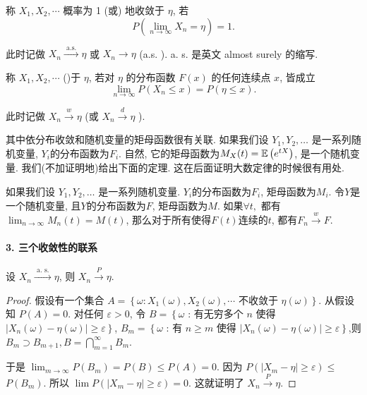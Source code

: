 \begin{definition}
    称 $X_1, X_2, \cdots$ 概率为 1 (或) 地收敛于 $\eta$, 若
$$
P\left(\lim _{n \rightarrow \infty} X_n=\eta\right)=1 .
$$

此时记做 $X_n \stackrel{\text { a.s. }}{\longrightarrow} \eta$ 或 $X_n \rightarrow \eta$ (a.s. ). a. s. 是英文 almost surely 的缩写.
\end{definition}

\begin{definition}
    称 $X_1, X_2, \cdots$ ()于 $\eta$, 若对 $\eta$ 的分布函数 $F(x)$ 的任何连续点 $x$, 皆成立
    $$
    \lim _{n \rightarrow \infty} P\left(X_n \leq x\right)=P(\eta \leq x) .
    $$
    
    此时记做 $X_n \stackrel{w}{\longrightarrow} \eta$ (或 $X_n \stackrel{d}{\longrightarrow} \eta$ ).
\end{definition}

其中依分布收敛和随机变量的矩母函数很有关联. 如果我们设 $Y_1, Y_2, \dots$ 是一系列随机变量, $Y_i$的分布函数为$F_i$. 自然, 它的矩母函数为$M_X(t)=\mathbb E\left( e^{t X}\right)$, 是一个随机变量. 我们(不加证明地)给出下面的定理. 这在后面证明大数定律的时候很有用处. 

\begin{theorem}
    \label{thm:dist-moment}
    如果我们设 $Y_1, Y_2, \dots$ 是一系列随机变量. $Y_i$的分布函数为$F_i$, 矩母函数为$M_i$. 令$Y$是一个随机变量, 且$Y$的分布函数为$F$, 矩母函数为$M$. 如果$\forall t,$ 都有$\lim _{n \rightarrow \infty} M_n(t)=M(t)$, 那么对于所有使得$F(t)$连续的$t$, 都有$F_n \stackrel{w}{\longrightarrow} F$. 
\end{theorem}

\paragraph{3. 三个收敛性的联系}

\begin{theorem}
    设 $X_n \stackrel{\text { a. s. }}{\longrightarrow} \eta$, 则 $X_n \stackrel{P}{\longrightarrow} \eta$.
\end{theorem}

\begin{proof}
    假设有一个集合 $A=\left\{\omega: X_1(\omega), X_2(\omega), \cdots\right.$ 不收敛于 $\left.\eta(\omega)\right\}$. 从假设知 $P(A)=0$. 对任何 $\varepsilon>0$, 令
$B=\left\{\omega\right.$ : 有无穷多个 $n$ 使得 $\left.\left|X_n(\omega)-\eta(\omega)\right| \geq \varepsilon\right\}$,
$B_m=\left\{\omega\right.$ : 有 $n \geq m$ 使得 $\left.\left|X_n(\omega)-\eta(\omega)\right| \geq \varepsilon\right\}$,则 $B_m \supset B_{m+1}, B=\bigcap_{m=1}^{\infty} B_m$.

于是 $\lim _{m \rightarrow \infty} P\left(B_m\right)=P(B) \leq P(A)=0$. 因为 $P\left(\left|X_m-\eta\right| \geq \varepsilon\right) \leq$ $P\left(B_m\right)$. 所以 $\lim P\left(\left|X_m-\eta\right| \geq \varepsilon\right)=0$. 这就证明了 $X_n \stackrel{P}{\longrightarrow} \eta$.
\end{proof}

